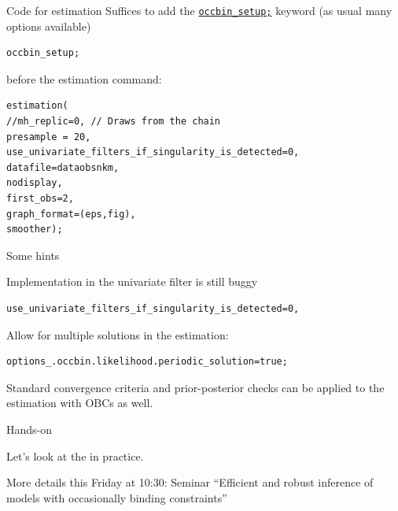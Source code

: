 \begin{frame}[fragile]{Code for estimation}
Suffices to add the \href{https://www.dynare.org/manual/the-model-file.html?highlight=occbin_setup#occbin_setup}{\texttt{occbin\_setup;}} keyword (as usual many options available)
\begin{verbatim}
occbin_setup;
\end{verbatim}
before the  estimation command:
\begin{verbatim}
estimation(
//mh_replic=0, // Draws from the chain
presample = 20,
use_univariate_filters_if_singularity_is_detected=0,
datafile=dataobsnkm,
nodisplay, 
first_obs=2,
graph_format=(eps,fig), 
smoother);
\end{verbatim}
\end{frame}

\begin{frame}[fragile]{Some hints}
\begin{wideitemize}
\item Implementation in the univariate filter is still buggy
\begin{verbatim}
use_univariate_filters_if_singularity_is_detected=0,
\end{verbatim}
\item Allow for multiple solutions in the estimation:
\begin{verbatim}
options_.occbin.likelihood.periodic_solution=true;
\end{verbatim}
\item Standard convergence criteria and prior-posterior checks can be applied to the estimation with OBCs as well.
\end{wideitemize}
\end{frame}





\begin{frame}{Hands-on}
\begin{wideitemize}
\item Let's look at the  in practice.
\item More details this Friday at 10:30: Seminar ``Efficient and robust inference of models with occasionally binding constraints'' 
\end{wideitemize}
\end{frame}